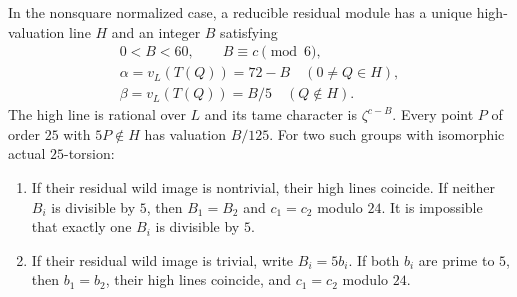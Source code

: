\begin{lemma}
\label{lem:B-RD65-Newton}
In the nonsquare normalized case, a reducible residual module has a
unique high-valuation line $H$ and an integer $B$ satisfying
\[
 \begin{gathered}
 0<B<60,\qquad B\equiv c\pmod6,\\
 \alpha=v_L(T(Q))=72-B\quad(0\ne Q\in H),\\
 \beta=v_L(T(Q))=B/5\quad(Q\notin H).
 \end{gathered}                                      \tag{B-RD65.1}
\]
The high line is rational over $L$ and its tame character is
$\zeta^{c-B}$. Every point $P$ of order $25$ with $5P\notin H$
has valuation $B/125$.
For two such groups with isomorphic actual $25$-torsion:
\begin{enumerate}
\item If their residual wild image is nontrivial, their high lines
coincide. If neither $B_i$ is divisible by $5$, then $B_1=B_2$ and
$c_1=c_2$ modulo $24$. It is impossible that exactly one $B_i$ is
divisible by $5$.
\item If their residual wild image is trivial, write $B_i=5b_i$.
If both $b_i$ are prime to $5$, then $b_1=b_2$, their high lines
coincide, and $c_1=c_2$ modulo $24$.
\end{enumerate}
\end{lemma}
